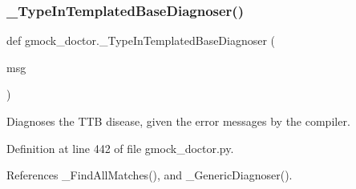 \mbox{\label{namespacegmock__doctor_ac4e4908d4e43ef87f522365e99ec36c8}} 
\subsubsection{\texorpdfstring{\+\_\+\+Type\+In\+Templated\+Base\+Diagnoser()}{\_TypeInTemplatedBaseDiagnoser()}}
{\footnotesize\ttfamily def gmock\+\_\+doctor.\+\_\+\+Type\+In\+Templated\+Base\+Diagnoser (\begin{DoxyParamCaption}\item[{}]{msg }\end{DoxyParamCaption})\hspace{0.3cm}{\ttfamily [private]}}

\begin{DoxyVerb}Diagnoses the TTB disease, given the error messages by the compiler.\end{DoxyVerb}
 

Definition at line 442 of file gmock\+\_\+doctor.\+py.



References \+\_\+\+Find\+All\+Matches(), and \+\_\+\+Generic\+Diagnoser().


